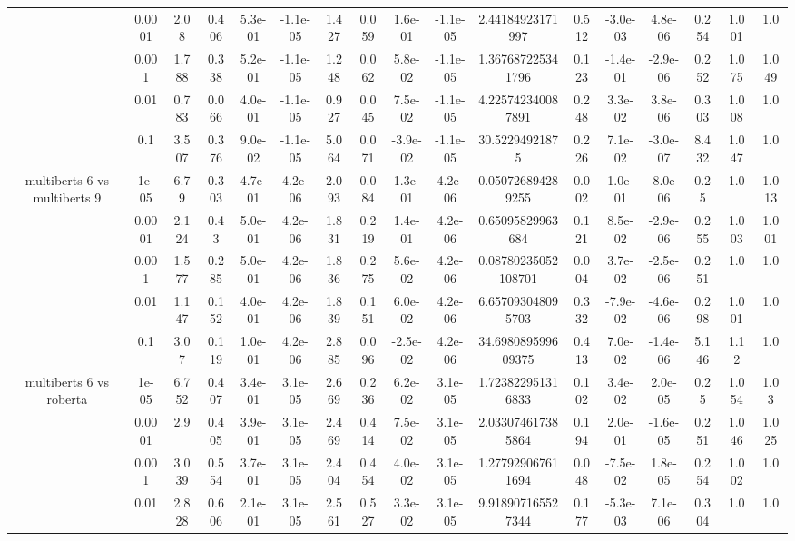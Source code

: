 \begin{tabular}{|c|c|c|c|c|c|c|c|c|c|c|c|c|c|c|c|c|}
 & 0.0001 & 2.08 & 0.406 & 5.3e-01 & -1.1e-05 & 1.427 & 0.059 & 1.6e-01 & -1.1e-05 & 2.44184923171997 & 0.512 & -3.0e-03 & 4.8e-06 & 0.254 & 1.001 & 1.0 \\
 & 0.001 & 1.788 & 0.338 & 5.2e-01 & -1.1e-05 & 1.248 & 0.062 & 5.8e-02 & -1.1e-05 & 1.367687225341796 & 0.123 & -1.4e-01 & -2.9e-06 & 0.252 & 1.075 & 1.049 \\
 & 0.01 & 0.783 & 0.066 & 4.0e-01 & -1.1e-05 & 0.927 & 0.045 & 7.5e-02 & -1.1e-05 & 4.225742340087891 & 0.248 & 3.3e-02 & 3.8e-06 & 0.303 & 1.008 & 1.0 \\
 & 0.1 & 3.507 & 0.376 & 9.0e-02 & -1.1e-05 & 5.064 & 0.071 & -3.9e-02 & -1.1e-05 & 30.52294921875 & 0.226 & 7.1e-02 & -3.0e-07 & 8.432 & 1.047 & 1.0 \\
\hline
\multirow{5}{*}{multiberts 6 vs multiberts 9} & 1e-05 & 6.79 & 0.303 & 4.7e-01 & 4.2e-06 & 2.093 & 0.084 & 1.3e-01 & 4.2e-06 & 0.050726894289255 & 0.002 & 1.0e-01 & -8.0e-06 & 0.25 & 1.0 & 1.013 \\
 & 0.0001 & 2.124 & 0.43 & 5.0e-01 & 4.2e-06 & 1.831 & 0.219 & 1.4e-01 & 4.2e-06 & 0.65095829963684 & 0.121 & 8.5e-02 & -2.9e-06 & 0.255 & 1.003 & 1.001 \\
 & 0.001 & 1.577 & 0.285 & 5.0e-01 & 4.2e-06 & 1.836 & 0.275 & 5.6e-02 & 4.2e-06 & 0.08780235052108701 & 0.004 & 3.7e-02 & -2.5e-06 & 0.251 & 1.0 & 1.0 \\
 & 0.01 & 1.147 & 0.152 & 4.0e-01 & 4.2e-06 & 1.839 & 0.151 & 6.0e-02 & 4.2e-06 & 6.657093048095703 & 0.332 & -7.9e-02 & -4.6e-06 & 0.298 & 1.001 & 1.0 \\
 & 0.1 & 3.07 & 0.119 & 1.0e-01 & 4.2e-06 & 2.885 & 0.096 & -2.5e-02 & 4.2e-06 & 34.698089599609375 & 0.413 & 7.0e-02 & -1.4e-06 & 5.146 & 1.12 & 1.0 \\
\hline
\multirow{5}{*}{multiberts 6 vs roberta } & 1e-05 & 6.752 & 0.407 & 3.4e-01 & 3.1e-05 & 2.669 & 0.236 & 6.2e-02 & 3.1e-05 & 1.723822951316833 & 0.102 & 3.4e-02 & 2.0e-05 & 0.25 & 1.054 & 1.03 \\
 & 0.0001 & 2.9 & 0.405 & 3.9e-01 & 3.1e-05 & 2.469 & 0.414 & 7.5e-02 & 3.1e-05 & 2.033074617385864 & 0.194 & 2.0e-01 & -1.6e-05 & 0.251 & 1.046 & 1.025 \\
 & 0.001 & 3.039 & 0.554 & 3.7e-01 & 3.1e-05 & 2.404 & 0.454 & 4.0e-02 & 3.1e-05 & 1.277929067611694 & 0.048 & -7.5e-02 & 1.8e-05 & 0.254 & 1.002 & 1.0 \\
 & 0.01 & 2.828 & 0.606 & 2.1e-01 & 3.1e-05 & 2.561 & 0.527 & 3.3e-02 & 3.1e-05 & 9.918907165527344 & 0.177 & -5.3e-03 & 7.1e-06 & 0.304 & 1.0 & 1.0 \\

\end{tabular}
